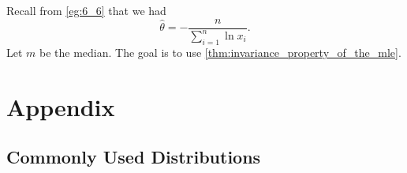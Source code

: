 \documentclass[notoc,notitlepage]{tufte-book}
\begin{document}
\begin{solution}
  Recall from \cref{eg:6_6} that we had
  \begin{equation*}
    \hat{\theta} = - \frac{n}{\sum\limits_{i=1}^{n} \ln x_i}.
  \end{equation*}
  Let $m$ be the median. The goal is to use \cref{thm:invariance_property_of_the_mle}. 
\end{solution}



\nobibliography*


\chapter{Appendix}%
\label{chp:appendix}

\section{Commonly Used Distributions}%
\label{sec:commonly_used_distributions}
\end{document}
